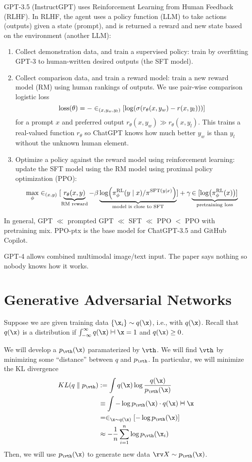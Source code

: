 \documentclass[class=cs480,notes,tikz]{agony}
\begin{document}
GPT-3.5 (InstructGPT) uses Reinforcement Learning from Human Feedback (RLHF).
In RLHF, the agent uses a policy function (LLM)
to take actions (outputs) given a state (prompt),
and is returned a reward and new state based on the environment (another LLM):
\begin{enumerate}
  \item Collect demonstration data, and train a supervised policy:
        train by overfitting GPT-3 to human-written desired outputs
        (the SFT model).
  \item Collect comparison data, and train a reward model:
        train a new reward model (RM) using human rankings of outputs.
        We use pair-wise comparison logistic loss
        \[ \operatorname{loss}(\theta) = -\in_{(x,y_w,y_l)}[\log(\sigma(r_\theta(x,y_w) - r(x,y_l)))] \]
        for a prompt $x$ and preferred output $r_\theta(x,y_w) \gg r_\theta(x,y_l)$.
        This trains a real-valued function $r_\theta$ so ChatGPT knows
        how much better $y_w$ is than $y_l$ without the unknown human element.
  \item Optimize a policy against the reward model using reinforcement learning:
        update the SFT model using the RM model using proximal policy optimization (PPO):
        \[
          \max_\phi \in_{(x,y)} [
          \underbrace{r_\theta(x,y)}_{\text{RM reward}}
          - \beta\underbrace{\log(\pi_\phi^{\text{RL}}(y \mid x) / \pi^{\text{SFT}(y \mid x)})}_{\text{model is close to SFT}}
          ] + \gamma\underbrace{\in[\log(\pi_\phi^{\text{RL}}(x))]}_{\text{pretraining loss}}
        \]
\end{enumerate}
In general, GPT $\ll$ prompted GPT $\ll$ SFT $\ll$ PPO $<$ PPO with pretraining mix.
PPO-ptx is the base model for ChatGPT-3.5 and GitHub Copilot.

GPT-4 allows combined multimodal image/text input.
The paper says nothing so nobody knows how it works.

\section{Generative Adversarial Networks}


Suppose we are given training data $\{\x_i\} \sim q(\x)$, i.e.,
with  $q(\x)$.
Recall that $q(\x)$ is a distribution if $\int_{-\infty}^\infty q(\x) \dd{\x} = 1$
and $q(\x) \geq 0$.

We will develop a  $p_{\vth}(\x)$
paramaterized by $\vth$.
We will find $\vth$ by minimizing some ``distance'' between $q$ and $p_{\vth}$.
In particular, we will minimize the KL divergence
\begin{align*}
  KL(q \parallel p_{\vth})
   & := \int q(\x)\log\frac{q(\x)}{p_{\vth}(\x)}        \\
   & \equiv \int -\log p_{\vth}(\x) \cdot q(\x) \dd{\x} \\
   & = \E_{\x \sim q(\x)}[-\log p_{\vth}(\x)]           \\
   & \approx -\frac1n \sum_{i=1}^n\log p_{\vth}(\x_i)
\end{align*}
Then, we will use $p_{\vth}(\x)$ to generate new data $\rv X \sim p_{\vth}(\x)$.
\end{document}

